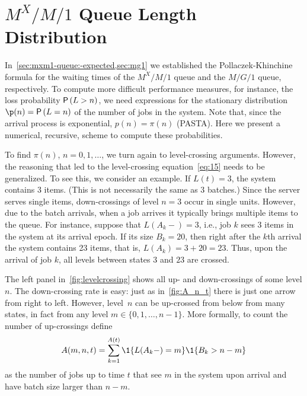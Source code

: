 \section{$M^X/M/1$ Queue Length Distribution}
\label{sec:batch-arrivals}


In~\cref{sec:mxm1-queue:-expected,sec:mg1} we established the Pollaczek-Khinchine formula for the waiting times of the $M^X/M/1$ queue and the $M/G/1$ queue, respectively.
To compute more difficult performance measures, for instance, the loss probability $\P{L>n}$, we need expressions for the stationary distribution $\p(n)=\P{L=n}$ of the number of jobs in the system. Note that, since the arrival process is exponential, $p(n)=\pi(n)$ (PASTA). Here we present a numerical, recursive, scheme to compute these probabilities.




To find $\pi(n)$, $n=0, 1, \ldots$, we turn again to level-crossing arguments.
However, the reasoning that led to the level-crossing equation~\cref{eq:15} needs to be generalized.
To see this, we consider an example.
If $L(t)=3$, the system contains $3$ items.
(This is not necessarily the same as 3 batches.)
Since the server serves single items, down-crossings of level $n=3$ occur in single units.
However, due to the batch arrivals, when a job arrives it typically brings multiple items to the queue.
For instance, suppose that $L(A_k-) = 3$, i.e., job $k$ sees 3 items in the system at its arrival epoch.
If its size $B_k = 20$, then right after the $k$th arrival the system contains 23 items, that is, $L(A_k)=3+20=23$.
Thus, upon the arrival of job $k$, all levels between states $3$ and $23$ are crossed.

The left panel in~\cref{fig:levelcrossing} shows all up- and down-crossings of some level $n$.
The down-crossing rate is easy: just as in~\cref{fig:A_n_t} there is just one arrow from right to left.
However, level~$n$ can be up-crossed from below from many states, in fact from any level $m \in \{0, 1, \ldots, n-1\}$. 
More formally, to count the number of up-crossings define
\begin{equation*}
 A(m,n,t) = \sum_{k=1}^{A(t)}\1{L(A_k-) = m}\1{B_k > n-m}
\end{equation*}
as the number of jobs up to time $t$ that see $m$ in the system upon arrival and have batch size larger than $n-m$.


